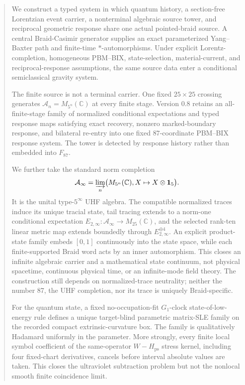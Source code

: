 \documentclass[11pt]{article}
\theoremstyle{definition}
\theoremstyle{remark}
\newcommand{\cA}{\mathcal{A}}
\newcommand{\id}{\mathbf{1}}
\begin{document}
\begin{abstract}
We construct a typed system in which quantum history, a section-free Lorentzian event carrier, a nonterminal algebraic source tower, and reciprocal geometric response share one actual pointed-braid source. A central Braid-Casimir generator supplies an exact parameterized Yang--Baxter path and finite-time $*$-automorphisms. Under explicit Lorentz-completion, homogeneous PBM--BIX, state-selection, material-current, and reciprocal-response assumptions, the same source data enter a conditional semiclassical gravity system.

The finite source is not a terminal carrier. One fixed $25\times25$ crossing generates $\cA_n=M_{5^n}(\mathbb C)$ at every finite stage. Version 0.8 retains an all-finite-stage family of normalized conditional expectations and typed response maps satisfying exact recovery, nonzero marked-boundary response, and bilateral re-entry into one fixed $87$-coordinate PBM--BIX response system. The tower is detected by response history rather than embedded into $F_{87}$.

We further take the standard norm completion
\begin{equation*}
  \cA_\infty=\varinjlim_n\bigl(M_{5^n}(\mathbb C),X\mapsto X\otimes\id_5\bigr).
\end{equation*}
It is the unital type-$5^\infty$ UHF algebra. The compatible normalized traces induce its unique tracial state, tail tracing extends to a norm-one conditional expectation $E_{2,\infty}:\cA_\infty\to M_{25}(\mathbb C)$, and the selected rank-ten linear metric map extends boundedly through $E_{2,\infty}^{\oplus4}$. An explicit product-state family embeds $[0,1]$ continuously into the state space, while each finite-supported Braid word acts by an inner automorphism. This closes an infinite algebraic carrier and a mathematical state continuum, not physical spacetime, continuous physical time, or an infinite-mode field theory. The construction still depends on normalized-trace neutrality; neither the number 87, the UHF completion, nor its trace is uniquely Braid-specific.

For the quantum state, a fixed no-occupation-fit $G_1$-clock state-of-low-energy rule defines a unique target-blind parametric matrix-SLE family on the recorded compact extrinsic-curvature box. The family is qualitatively Hadamard uniformly in the parameter. More strongly, every finite local symbol coefficient of the same-operator $W-H_{\mathrm{ps}}$ stress kernel, including four fixed-chart derivatives, cancels before interval absolute values are taken. This closes the ultraviolet subtraction problem but not the nonlocal smooth finite coincidence limit.


\end{abstract}
\end{document}
